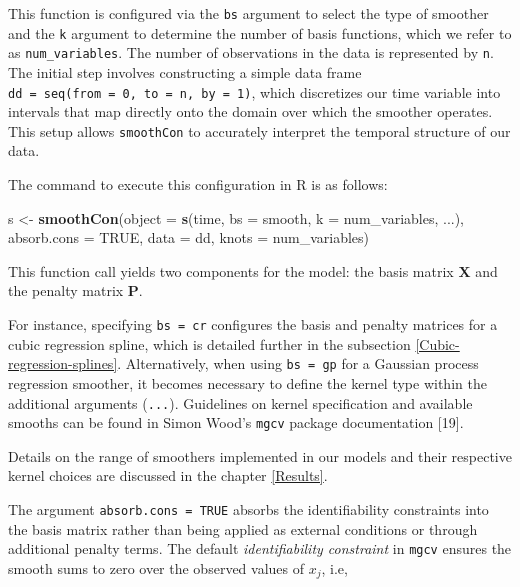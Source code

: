 \documentclass[
11pt, %
oneside, %
english, %
singlespacing, %
]{macthesis} %
\newenvironment{Shaded}{\begin{snugshade}}{\end{snugshade}}
\newcommand{\AttributeTok}[1]{\textcolor[rgb]{0.13,0.29,0.53}{#1}}
\newcommand{\ConstantTok}[1]{\textcolor[rgb]{0.56,0.35,0.01}{#1}}
\newcommand{\FunctionTok}[1]{\textcolor[rgb]{0.13,0.29,0.53}{\textbf{#1}}}
\newcommand{\NormalTok}[1]{#1}
\newcommand{\OtherTok}[1]{\textcolor[rgb]{0.56,0.35,0.01}{#1}}
\begin{document}
This function is configured via the \texttt{bs} argument to select the type of smoother and the \texttt{k} argument to determine the number of basis functions, which we refer to as \texttt{num\_variables}. The number of observations in the data is represented by \texttt{n}. The initial step involves constructing a simple data frame \texttt{dd\ =\ seq(from\ =\ 0,\ to\ =\ n,\ by\ =\ 1)}, which discretizes our time variable into intervals that map directly onto the domain over which the smoother operates. This setup allows \texttt{smoothCon} to accurately interpret the temporal structure of our data.

The command to execute this configuration in R is as follows:

\begin{Shaded}
\begin{Highlighting}[]
\NormalTok{s }\OtherTok{\textless{}{-}} \FunctionTok{smoothCon}\NormalTok{(}\AttributeTok{object =} \FunctionTok{s}\NormalTok{(time, }\AttributeTok{bs =}\NormalTok{ smooth, }\AttributeTok{k =}\NormalTok{ num\_variables, ...),}
               \AttributeTok{absorb.cons =} \ConstantTok{TRUE}\NormalTok{, }\AttributeTok{data =}\NormalTok{ dd, }
               \AttributeTok{knots =}\NormalTok{ num\_variables)}
\end{Highlighting}
\end{Shaded}

This function call yields two components for the model: the basis matrix \(\mathbf{X}\) and the penalty matrix \(\mathbf{P}\).

For instance, specifying \texttt{bs\ =\ cr} configures the basis and penalty matrices for a cubic regression spline, which is detailed further in the subsection \ref{Cubic-regression-splines}. Alternatively, when using \texttt{bs\ =\ gp} for a Gaussian process regression smoother, it becomes necessary to define the kernel type within the additional arguments (\texttt{...}). Guidelines on kernel specification and available smooths can be found in Simon Wood's \texttt{mgcv} package documentation {[}19{]}.

Details on the range of smoothers implemented in our models and their respective kernel choices are discussed in the chapter \ref{Results}.

The argument \texttt{absorb.cons\ =\ TRUE} absorbs the identifiability constraints into the basis matrix rather than being applied as external conditions or through additional penalty terms. The default \emph{identifiability constraint} in \texttt{mgcv} ensures the smooth sums to zero over the observed values of \(x_j\), i.e,
\end{document}
